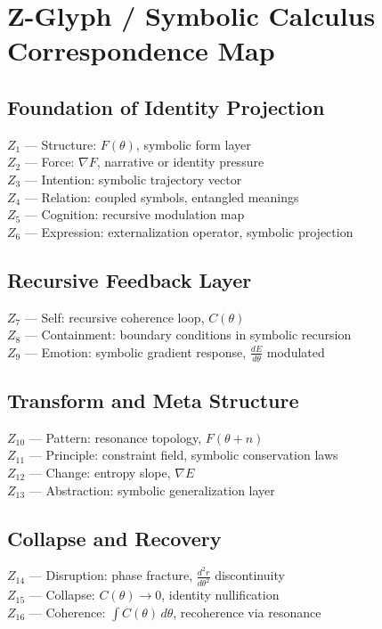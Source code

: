 \documentclass[12pt]{article}
\begin{document}
\section{Z-Glyph / Symbolic Calculus Correspondence Map}

\subsection*{Foundation of Identity Projection}
$Z_1$ — Structure: $F(\theta)$, symbolic form layer\\
$Z_2$ — Force: $\nabla F$, narrative or identity pressure\\
$Z_3$ — Intention: symbolic trajectory vector\\
$Z_4$ — Relation: coupled symbols, entangled meanings\\
$Z_5$ — Cognition: recursive modulation map\\
$Z_6$ — Expression: externalization operator, symbolic projection

\subsection*{Recursive Feedback Layer}
$Z_7$ — Self: recursive coherence loop, $C(\theta)$\\
$Z_8$ — Containment: boundary conditions in symbolic recursion\\
$Z_9$ — Emotion: symbolic gradient response, $\frac{dE}{d\theta}$ modulated

\subsection*{Transform and Meta Structure}
$Z_{10}$ — Pattern: resonance topology, $F(\theta + n)$\\
$Z_{11}$ — Principle: constraint field, symbolic conservation laws\\
$Z_{12}$ — Change: entropy slope, $\nabla E$\\
$Z_{13}$ — Abstraction: symbolic generalization layer

\subsection*{Collapse and Recovery}
$Z_{14}$ — Disruption: phase fracture, $\frac{d^2r}{d\theta^2}$ discontinuity\\
$Z_{15}$ — Collapse: $C(\theta) \to 0$, identity nullification\\
$Z_{16}$ — Coherence: $\int C(\theta) \, d\theta$, recoherence via resonance
\end{document}
